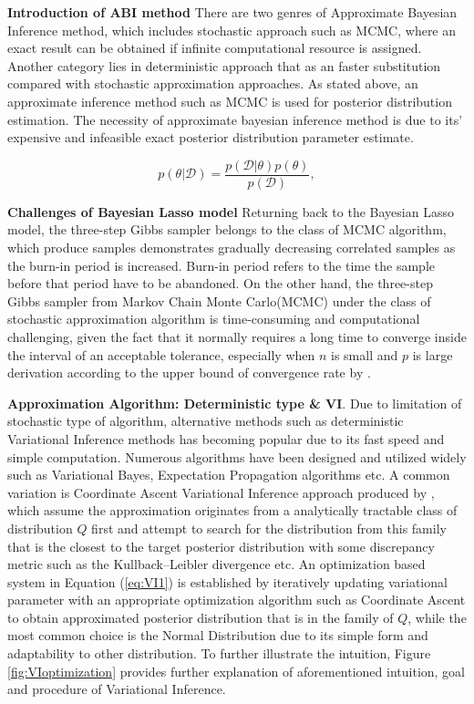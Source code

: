 \textbf{Introduction of ABI method}
There are two genres of Approximate Bayesian Inference method, which includes stochastic approach such as MCMC, where an exact result can be obtained if infinite computational resource is assigned. Another category lies in deterministic approach that as an faster substitution compared with stochastic approximation approaches.
As stated above, an approximate inference method such as MCMC is used for posterior distribution estimation. The necessity of approximate bayesian inference method is due to its' expensive and infeasible exact posterior distribution parameter estimate.

\begin{equation}
	p(\theta|\mathcal{D}) = \frac{p(\mathcal{D}|\theta)p(\theta)}{p(\mathcal{D})},
	\label{eq:Bayesrule}
\end{equation}

\textbf{Challenges of Bayesian Lasso model}
 Returning back to the Bayesian Lasso model, the three-step Gibbs sampler belongs to the class of MCMC algorithm, which produce samples demonstrates gradually decreasing correlated samples as the burn-in period is increased. Burn-in period refers to the time the sample before that period have to be abandoned. On the other hand, the three-step Gibbs sampler from Markov Chain Monte Carlo(MCMC) under the class of stochastic approximation algorithm is time-consuming and computational challenging, given the fact that it normally requires a long time to converge inside the interval of an acceptable tolerance, especially when $n$ is small and $p$ is large derivation according to the upper bound of convergence rate by \cite{rajaratnam_sparks_2015}. 


\textbf{Approximation Algorithm: Deterministic type \& VI}.
 Due to limitation of stochastic type of algorithm, alternative methods such as deterministic Variational Inference methods has becoming popular due to its fast speed and simple computation. 
 Numerous algorithms have been designed and utilized widely such as Variational Bayes, Expectation Propagation algorithms etc. A common variation is Coordinate Ascent Variational Inference approach produced by \cite{Blei2003LDA} , which assume the approximation originates from a analytically tractable class of distribution $Q$ first and attempt to search for the distribution from this family that is the closest to the target posterior distribution with some discrepancy metric such as the Kullback–Leibler divergence etc.  
 An optimization based system in Equation (\ref{eq:VI1}) is established by iteratively updating variational parameter with an appropriate optimization algorithm such as Coordinate Ascent to obtain approximated posterior distribution that is in the family of $Q$, while the most common choice is the Normal Distribution due to its simple form and adaptability to other distribution.
 To further illustrate the intuition, Figure \ref{fig:VIoptimization} provides further explanation of aforementioned intuition, goal and procedure of Variational Inference.
 
